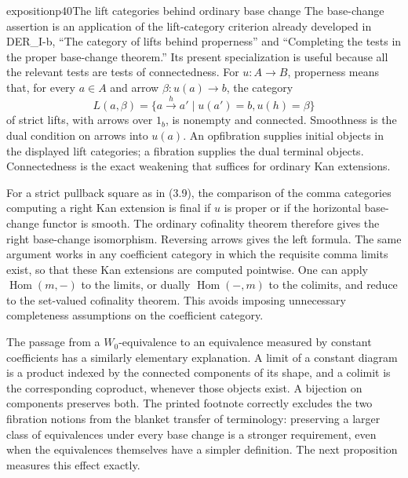 \begin{dcomment}{exposition}{p40}{The lift categories behind ordinary base change}
The base-change assertion is an application of the lift-category criterion already developed in DER\_I-b, ``The category of lifts behind properness'' and ``Completing the tests in the proper base-change theorem.'' Its present specialization is useful because all the relevant tests are tests of connectedness. For $u:A\longrightarrow B$, properness means that, for every $a\in A$ and arrow $\beta:u(a)\longrightarrow b$, the category
\[
 L(a,\beta)=\{a\xrightarrow{h}a'\mid u(a')=b, u(h)=\beta\}
\]
of strict lifts, with arrows over $1_b$, is nonempty and connected. Smoothness is the dual condition on arrows into $u(a)$. An opfibration supplies initial objects in the displayed lift categories; a fibration supplies the dual terminal objects. Connectedness is the exact weakening that suffices for ordinary Kan extensions.

For a strict pullback square as in (3.9), the comparison of the comma categories computing a right Kan extension is final if $u$ is proper or if the horizontal base-change functor is smooth. The ordinary cofinality theorem therefore gives the right base-change isomorphism. Reversing arrows gives the left formula. The same argument works in any coefficient category in which the requisite comma limits exist, so that these Kan extensions are computed pointwise. One can apply $\operatorname{Hom}(m,-)$ to the limits, or dually $\operatorname{Hom}(-,m)$ to the colimits, and reduce to the set-valued cofinality theorem. This avoids imposing unnecessary completeness assumptions on the coefficient category.

The passage from a $W_0$-equivalence to an equivalence measured by constant coefficients has a similarly elementary explanation. A limit of a constant diagram is a product indexed by the connected components of its shape, and a colimit is the corresponding coproduct, whenever those objects exist. A bijection on components preserves both. The printed footnote correctly excludes the two fibration notions from the blanket transfer of terminology: preserving a larger class of equivalences under every base change is a stronger requirement, even when the equivalences themselves have a simpler definition. The next proposition measures this effect exactly.
\end{dcomment}

